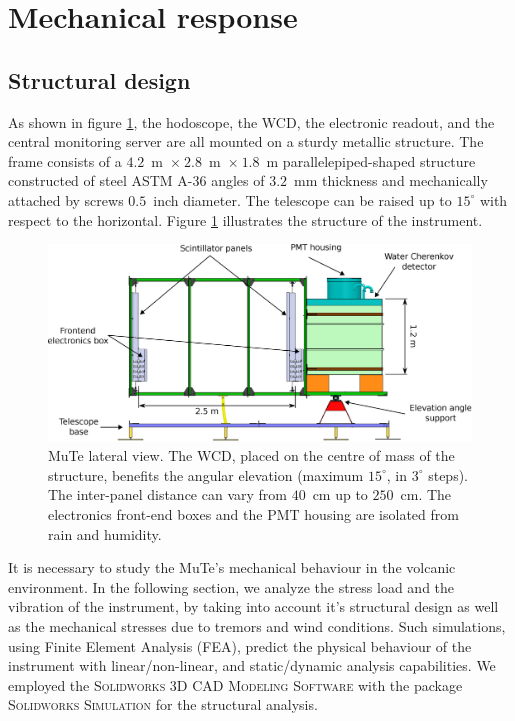 \documentclass[letterpaper,11pt]{article}
\begin{document}
\section{Mechanical response}
\label{mechanical}
\subsection{Structural design}
As shown in figure \ref{fig:Structure}, the hodoscope, the WCD, the electronic readout, and the central monitoring server are all mounted on a sturdy metallic structure. The frame consists of a $4.2$~m~$\times~2.8$~m~$\times~1.8$~m parallelepiped-shaped structure constructed of steel ASTM A-36 angles of $3.2$~mm thickness and mechanically attached by screws $0.5$~inch diameter. The telescope can be raised up to $15^{\circ}$ with respect to the horizontal. Figure \ref{fig:Structure} illustrates the structure of the instrument.


\begin{figure}[htb]
\centering
\includegraphics[width=1\columnwidth]{Figures/Detector.eps}
\caption{MuTe lateral view. The WCD, placed on the centre of mass of the structure, benefits the angular elevation (maximum $15^{\circ}$, in $3^{\circ}$ steps). The inter-panel distance can vary from  $40$~cm up to $250$~cm. The electronics front-end boxes and the PMT housing are isolated from rain and humidity.}
  \label{fig:Structure}
\end{figure}

 It is necessary to study the MuTe's mechanical behaviour in the volcanic environment. In the following section, we analyze the stress load and the vibration of the instrument, by taking into account it's structural design as well as the mechanical stresses due to tremors and wind conditions. Such simulations, using Finite Element Analysis (FEA), predict the physical behaviour of the instrument with linear/non-linear, and static/dynamic analysis capabilities. We employed the \textsc{Solidworks 3D CAD Modeling Software} with the package \textsc{Solidworks Simulation} for the structural analysis. 
\end{document}
